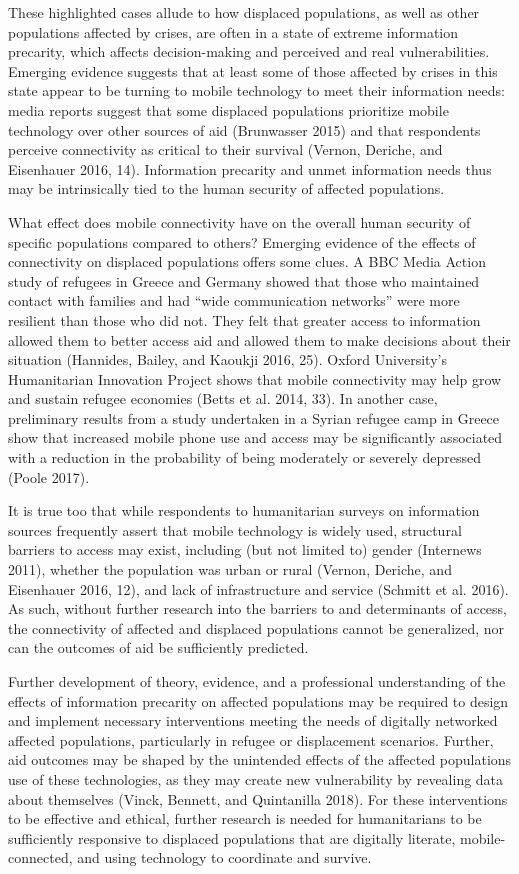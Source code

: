 \documentclass[
]{article}
\begin{document}
These highlighted cases allude to how displaced populations, as well as
other populations affected by crises, are often in a state of extreme
information precarity, which affects decision-making and perceived and
real vulnerabilities. Emerging evidence suggests that at least some of
those affected by crises in this state appear to be turning to mobile
technology to meet their information needs: media reports suggest that
some displaced populations prioritize mobile technology over other
sources of aid (Brunwasser 2015) and that respondents perceive
connectivity as critical to their survival (Vernon, Deriche, and
Eisenhauer 2016, 14). Information precarity and unmet information needs
thus may be intrinsically tied to the human security of affected
populations.

What effect does mobile connectivity have on the overall human security
of specific populations compared to others? Emerging evidence of the
effects of connectivity on displaced populations offers some clues. A
BBC Media Action study of refugees in Greece and Germany showed that
those who maintained contact with families and had ``wide communication
networks'' were more resilient than those who did not. They felt that
greater access to information allowed them to better access aid and
allowed them to make decisions about their situation (Hannides, Bailey,
and Kaoukji 2016, 25). Oxford University's Humanitarian Innovation
Project shows that mobile connectivity may help grow and sustain refugee
economies (Betts et al. 2014, 33). In another case, preliminary results
from a study undertaken in a Syrian refugee camp in Greece show that
increased mobile phone use and access may be significantly associated
with a reduction in the probability of being moderately or severely
depressed (Poole 2017).

It is true too that while respondents to humanitarian surveys on
information sources frequently assert that mobile technology is widely
used, structural barriers to access may exist, including (but not
limited to) gender (Internews 2011), whether the population was urban or
rural (Vernon, Deriche, and Eisenhauer 2016, 12), and lack of
infrastructure and service (Schmitt et al. 2016). As such, without
further research into the barriers to and determinants of access, the
connectivity of affected and displaced populations cannot be
generalized, nor can the outcomes of aid be sufficiently predicted.

Further development of theory, evidence, and a professional
understanding of the effects of information precarity on affected
populations may be required to design and implement necessary
interventions meeting the needs of digitally networked affected
populations, particularly in refugee or displacement scenarios. Further,
aid outcomes may be shaped by the unintended effects of the affected
populations use of these technologies, as they may create new
vulnerability by revealing data about themselves (Vinck, Bennett, and
Quintanilla 2018). For these interventions to be effective and ethical,
further research is needed for humanitarians to be sufficiently
responsive to displaced populations that are digitally literate,
mobile-connected, and using technology to coordinate and survive.
\end{document}
